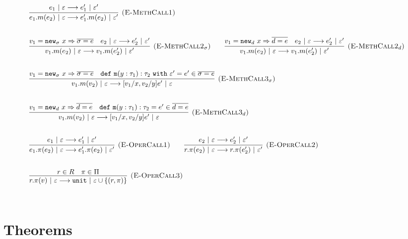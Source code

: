 \documentclass{llncs}
\newcommand{\keywadj}[1]{\mathtt{#1}}
\newcommand{\keyw}[1]{\keywadj{#1}~}
\begin{document}
\[
\begin{array}{lll}
	\infer[\textsc{(E-MethCall1)}]
		{e_1.m(e_2)~|~\varepsilon \longrightarrow e_1'.m(e_2)~|~\varepsilon'}
		{e_1~|~\varepsilon \longrightarrow e_1'~|~\varepsilon'}\\[5ex]

	\infer[\textsc{(E-MethCall2$_{\sigma}$)}]
		{v_1.m(e_2)~|~\varepsilon \longrightarrow v_1.m(e_2')~|~\varepsilon'}
		{v_1 = \keywadj{new}_{\sigma}~x \Rightarrow \overline{\sigma = e} & e_2~|~\varepsilon \longrightarrow e_2'~|~\varepsilon'}
				
		~~~~~~
	\infer[\textsc{(E-MethCall2$_d$)}]
		{v_1.m(e_2)~|~\varepsilon \longrightarrow v_1.m(e_2')~|~\varepsilon'}
		{v_1 = \keywadj{new}_{d}~x \Rightarrow \overline{d = e} & e_2~|~\varepsilon \longrightarrow e_2'~|~\varepsilon'}
		\\[5ex]
		
	\infer[\textsc{(E-MethCall3$_{\sigma}$)}]
		{v_1.m(v_2)~|~\varepsilon
			\longrightarrow
		 [v_1/x, v_2/y]e'~|~\varepsilon}
  		{v_1 = \keywadj{new}_{\sigma}~x \Rightarrow \overline{\sigma = e} & \keywadj{def~m}(y: \tau_1) : \tau_2~\keyw{with} \varepsilon' = e' \in \overline {\sigma = e}} \\[5ex]

	\infer[\textsc{(E-MethCall3$_{d}$)}]
		{v_1.m(v_2)~|~\varepsilon
			\longrightarrow
		 [v_1/x, v_2/y]e'~|~\varepsilon}
  		{v_1 = \keywadj{new}_{d}~x \Rightarrow \overline{d = e} & \keywadj{def~m}(y: \tau_1) : \tau_2 = e' \in \overline {d = e}} \\[5ex]
			
	\infer[\textsc{(E-OperCall1)}]
		{e_1.\pi(e_2)~|~\varepsilon
			\longrightarrow
		 e_1'.\pi(e_2)~|~\varepsilon'}
		{e_1~|~\varepsilon \longrightarrow e_1'~|~\varepsilon'}
~~~~~~
			\infer[\textsc{(E-OperCall2)}]
		{r.\pi(e_2)~|~\varepsilon
			\longrightarrow
		 r.\pi(e_2')~|~\varepsilon'}
		{e_2~|~\varepsilon \longrightarrow e_2'~|~\varepsilon'} \\[5ex]
			
			\infer[\textsc{(E-OperCall3)}]
		{r.\pi(v)~|~\varepsilon
			\longrightarrow
		 \keywadj{unit}~|~\varepsilon \cup \{(r, \pi)\}}
		{r \in R & \pi \in \Pi} \\[5ex]
			
		
\end{array}
\]

\newpage


\section{Theorems}
\end{document}
